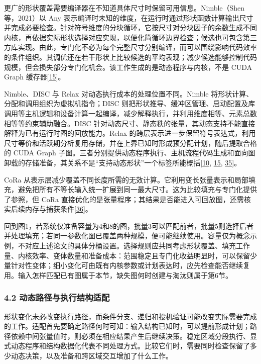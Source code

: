 \documentclass[UTF8,11pt,fontset=windows]{ctexart}
\begin{document}
更广的形状覆盖需要编译器在不知道具体尺寸时保留可用信息。Nimble（Shen 等，2021）以 Any 表示编译时未知的维度，在运行时通过形状函数计算输出尺寸并完成必要检查。针对符号维度的分块循环，它按尺寸对分块因子的余数生成不同内核，再依据实际形状选择对应实现，以便化简循环边界检查；候选也可包含第三方库实现。由此，专门化不必为每个完整尺寸分别编译，而可以围绕影响代码效率的条件组织。其调优还在若干形状上比较候选的平均表现；减少候选能够控制代码规模，但会损失部分专门化机会。该工作生成的是动态程序与内核，不是 CUDA Graph 缓存器\protect\hyperlink{ref-15}{{[}15{]}}。

Nimble、DISC 与 Relax 对动态执行成本的处理位置不同。Nimble 将形状计算、分配和调用组织为虚拟机指令；DISC 则把形状推导、缓冲区管理、启动配置及库调用等主机逻辑和设备计算一起编译，减少解释执行，并利用维度相等、元素总数相等等约束辅助融合。DISC 针对动态尺寸、静态秩的张量，其动态支持不能直接解释为已有运行时图的回放能力。Relax 的跨层表示进一步保留符号表达式，利用尺寸等价和活跃期分析复用存储，并在上界已知时形成预分配计划，随后提取合格的 CUDA Graph 子图。三者分别提供动态程序执行、主机流程代码生成和面向图卸载的存储准备，其关系不是``支持动态形状''一个标签所能概括\protect\hyperlink{ref-10}{{[}10}, \protect\hyperlink{ref-15}{15}, \protect\hyperlink{ref-35}{35{]}}。

CoRa 从表示层减少覆盖不同长度所需的无效计算。它利用变长张量表示和局部填充，避免把所有不等长输入统一扩展到同一最大尺寸。这为比较填充与专门化提供了参照，但 CoRa 直接优化的是张量程序；其结果是否能进入可回放图，还需核实后续内存与捕获条件\protect\hyperlink{ref-36}{{[}36{]}}。

回到图1，若系统仅准备容量为4和8的图，批量3可以匹配前者，批量5则选择后者并处理填充；若同一参数化图已覆盖两种规模，便可能继续使用。容量仅为概念示例，不对应上述论文的具体分桶设置。选择规则应共同考虑形状覆盖、填充工作量、内核效率、变体数量和准备成本：范围稳定且专门化收益明显时，可以保留少量针对性变体；细小变化可由既有内核参数或计划表达时，应先检查能否继续复用。输入怎样匹配已有图属于本节，缺失图何时创建与淘汰则属于第6节。

\hypertarget{section-4-2}{%
\subsubsection{4.2 动态路径与执行结构适配}\label{section-4-2}}

形状变化未必改变执行路径，而条件分支、递归和投机验证可能改变实际需要完成的工作。适配首先要确定路径何时可知：输入结构已知时，可以提前形成计划；路径依赖中间张量值时，则必须在相应结果产生后继续决策。稳定区域分段执行、显式动态程序和结构数据化代表不同处理方式。比较它们时，需要同时检查保留了多少动态决策，以及准备和跨区域交互增加了什么工作。
\end{document}
